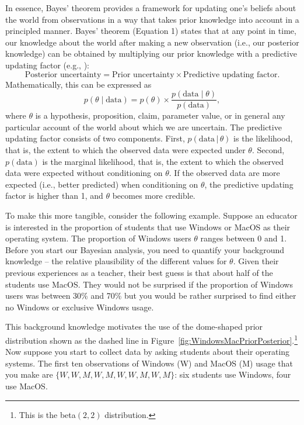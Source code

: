 \documentclass[man]{apa7}
\newcommand{\given}{\, | \,}
\begin{document}
In essence, Bayes' theorem provides a framework for updating one's beliefs about the world from observations in a way that takes prior knowledge into account in a principled manner. Bayes' theorem (Equation 1) states that at any point in time, our knowledge about the world after making a new observation (i.e., our posterior knowledge) can be obtained by multiplying our prior knowledge with a predictive updating factor (e.g., \cite{RouderMorey2019,WagenmakersEtAl2016CD} ):
\begin{equation*}
        \text{Posterior uncertainty} = \text{Prior uncertainty} \times \text{Predictive updating factor}.
\end{equation*}
Mathematically, this can be expressed as  
\begin{equation}
\label{eq:BayesRule}
        p(\theta \mid \text{data}) = p(\theta) \times \frac{p(\text{data} \mid \theta)}{p(\text{data})},
\end{equation}
where $\theta$ is a hypothesis, proposition, claim, parameter value, or in general any particular account of the world about which we are uncertain. The predictive updating factor consists of two components. First, $p(\text{data} \given \theta)$ is the likelihood, that is, the extent to which the observed data were expected under $\theta$. Second, $p(\text{data})$ is the marginal likelihood, that is, the extent to which the observed data were expected without conditioning on $\theta$. If the observed data are more expected (i.e., better predicted) when conditioning on $\theta$, the predictive updating factor is higher than 1, and $\theta$ becomes more credible. 

To make this more tangible, consider the following example. Suppose an educator is interested in the proportion of students that use Windows or MacOS as their operating system. The proportion of Windows users $\theta$ ranges between 0 and 1. Before you start our Bayesian analysis, you need to quantify your background knowledge -- the relative plausibility of the different values for $\theta$. Given their previous experiences as a teacher, their best guess is that about half of the students use MacOS. They would not be surprised if the proportion of Windows users was between 30\% and 70\% but you would be rather surprised to find either no Windows or exclusive Windows usage. 

This background knowledge motivates the use of the dome-shaped prior distribution shown as the dashed line in Figure~\ref{fig:WindowsMacPriorPosterior}.\footnote{This is the beta$(2,2)$ distribution.} Now suppose you start to collect data by asking students about their operating systems. The first ten observations of Windows (W) and MacOS (M) usage that you make are $\{W, W, M, W, M, W, W, M, W, M\}$: six students use Windows, four use MacOS. 
\end{document}
